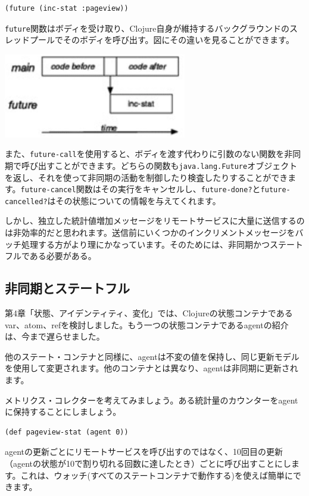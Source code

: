 \begin{lstlisting}[numbers=none]
(future (inc-stat :pageview))
\end{lstlisting}

\texttt{future}関数はボディを受け取り、Clojure自身が維持するバックグラウンドのスレッドプールでそのボディを呼び出す。図にその違いを見ることができます。

\includegraphics[width=8cm]{fig_05_002.eps}

また、\texttt{future-call}を使用すると、ボディを渡す代わりに引数のない関数を非同期で呼び出すことができます。どちらの関数も\texttt{java.lang.Future}オブジェクトを返し、それを使って非同期の活動を制御したり検査したりすることができます。\texttt{future-cancel}関数はその実行をキャンセルし、\texttt{future-done?}と\texttt{future-cancelled?}はその状態についての情報を与えてくれます。

しかし、独立した統計値増加メッセージをリモートサービスに大量に送信するのは非効率的だと思われます。送信前にいくつかのインクリメントメッセージをバッチ処理する方がより理にかなっています。そのためには、非同期かつステートフルである必要がある。


\subsection{非同期とステートフル}

第4章「状態、アイデンティティ、変化」では、Clojureの状態コンテナであるvar、atom、refを検討しました。もう一つの状態コンテナであるagentの紹介は、今まで遅らせました。

他のステート・コンテナと同様に、agentは不変の値を保持し、同じ更新モデルを使用して変更されます。他のコンテナとは異なり、agentは非同期に更新されます。

メトリクス・コレクターを考えてみましょう。ある統計量のカウンターをagentに保持することにしましょう。

\begin{lstlisting}[numbers=none]
(def pageview-stat (agent 0))
\end{lstlisting}

agentの更新ごとにリモートサービスを呼び出すのではなく、10回目の更新（agentの状態が10で割り切れる回数に達したとき）ごとに呼び出すことにします。これは、ウォッチ(すべてのステートコンテナで動作する)を使えば簡単にできます。



